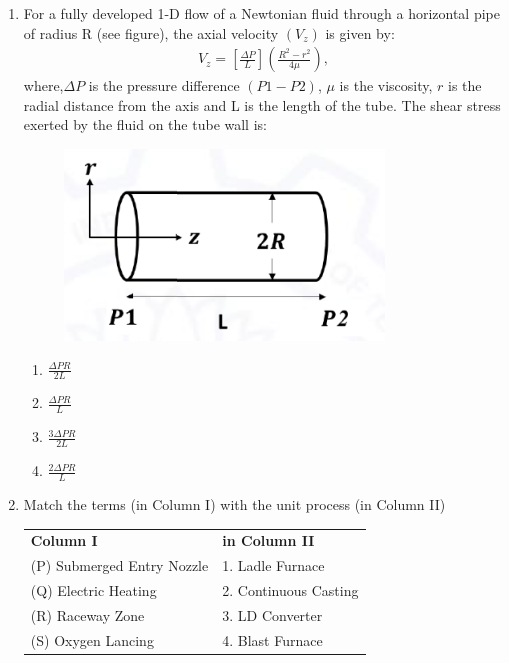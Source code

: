 \documentclass[journal]{IEEEtran}
\theoremstyle{remark}
\begin{document}
\begin{enumerate}[resume]
\item For a fully developed 1-D flow of a Newtonian fluid through a horizontal
pipe of radius R (see figure), the axial velocity $(V_z)$ is given by: 
\begin{align}
    V_z=[\frac{\Delta P}{L}](\frac{R^2-r^2}{4\mu}),
\end{align}
where,$\Delta P$ is the pressure difference $(P1-P2)$, $\mu$ is the viscosity, $r$ is the radial distance from the axis and L is the length of the tube. The shear
stress exerted by the fluid on the tube wall is:
\begin{figure}[H]
    \centering
    \includegraphics[width=0.5\columnwidth]{figs/Q.34.png}
    \caption{}
    \label{fig:placeholder}
\end{figure}
 \hfill{}
 \begin{multicols}{4}
\begin{enumerate}
\item $\frac{\Delta PR}{2L}$
\item $\frac{\Delta PR}{L}$
\item $\frac{3\Delta PR}{2L}$
\item $\frac{2\Delta PR}{L}$
\end{enumerate}
\end{multicols}

\item Match the terms (in Column I) with the unit process (in Column II)
\hfill{}
\begin{center}
    

\begin{tabular}{ll}
 \textbf{Column I }    & \textbf{in Column II} \\
   (P) Submerged Entry Nozzle  & 1. Ladle Furnace\\
   (Q) Electric Heating& 2. Continuous Casting\\
   (R) Raceway Zone&3. LD Converter\\
   (S) Oxygen Lancing &4. Blast Furnace\\
\end{tabular}
\end{center}


\end{enumerate}
\end{document}
